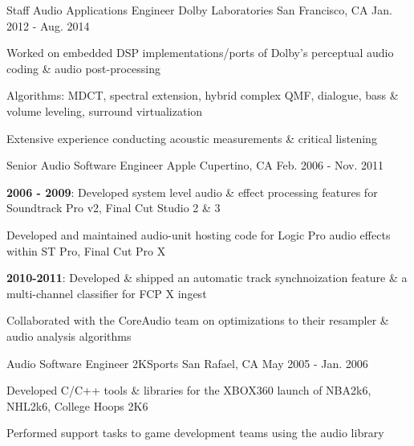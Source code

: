 \begin{cventries}
  \cventry
    {Staff Audio Applications Engineer} %
    {Dolby Laboratories} %
    {San Francisco, CA} %
    {Jan. 2012 - Aug. 2014} %
    {
      \begin{cvitems} %
        \item {Worked on embedded DSP implementations/ports of Dolby's perceptual audio coding \& audio post-processing}
        \item {Algorithms: MDCT, spectral extension, hybrid complex QMF, dialogue, bass \& volume leveling, surround virtualization}
		\item {Extensive experience conducting acoustic measurements \& critical listening}
      \end{cvitems}
    }

  \cventry
    {Senior Audio Software Engineer} %
    {Apple} %
    {Cupertino, CA} %
    {Feb. 2006 - Nov. 2011} %
    {
      \begin{cvitems} %
        \item {\textbf{2006 - 2009}: Developed system level audio \& effect processing features for Soundtrack Pro v2, Final Cut Studio 2 \& 3} 
        \item {Developed and maintained audio-unit hosting code for Logic Pro audio effects within ST Pro, Final Cut Pro X}
        \item {\textbf{2010-2011}: Developed \& shipped an automatic track synchnoization feature \& a multi-channel classifier for FCP X ingest}        
		\item {Collaborated with the CoreAudio team on optimizations to their resampler \& audio analysis algorithms}
      \end{cvitems}
    }

  \cventry
    {Audio Software Engineer} %
    {2KSports} %
    {San Rafael, CA} %
    {May 2005 - Jan. 2006} %
    {
      \begin{cvitems} %
        \item {Developed C/C++ tools \& libraries for the XBOX360 launch of NBA2k6, NHL2k6, College Hoops 2K6}
        \item {Performed support tasks to game development teams using the audio library}
      \end{cvitems}
    }

\end{cventries}
	